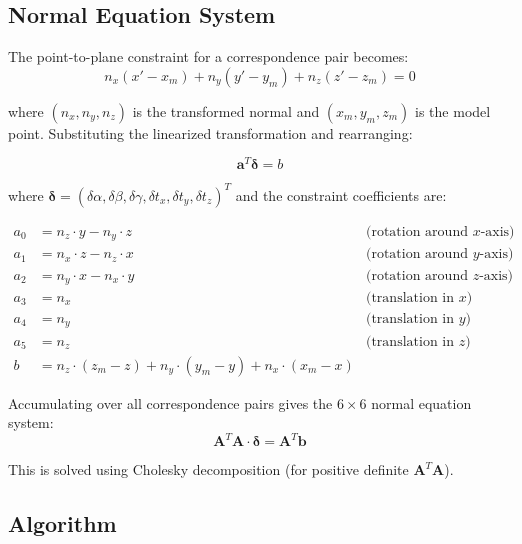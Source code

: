 \documentclass[11pt,a4paper]{article}
\begin{document}
\subsection{Normal Equation System}

The point-to-plane constraint for a correspondence pair becomes:
\begin{equation}
n_x(x' - x_m) + n_y(y' - y_m) + n_z(z' - z_m) = 0
\end{equation}

where $(n_x, n_y, n_z)$ is the transformed normal and $(x_m, y_m, z_m)$ is the model point. Substituting the linearized transformation and rearranging:

\begin{equation}
\mathbf{a}^T \boldsymbol{\delta} = b
\end{equation}

where $\boldsymbol{\delta} = (\delta\alpha, \delta\beta, \delta\gamma, \delta t_x, \delta t_y, \delta t_z)^T$ and the constraint coefficients are:

\begin{align}
a_0 &= n_z \cdot y - n_y \cdot z & \text{(rotation around } x\text{-axis)} \\
a_1 &= n_x \cdot z - n_z \cdot x & \text{(rotation around } y\text{-axis)} \\
a_2 &= n_y \cdot x - n_x \cdot y & \text{(rotation around } z\text{-axis)} \\
a_3 &= n_x & \text{(translation in } x\text{)} \\
a_4 &= n_y & \text{(translation in } y\text{)} \\
a_5 &= n_z & \text{(translation in } z\text{)} \\
b &= n_z \cdot (z_m - z) + n_y \cdot (y_m - y) + n_x \cdot (x_m - x)
\end{align}

Accumulating over all correspondence pairs gives the $6 \times 6$ normal equation system:
\begin{equation}
\mathbf{A}^T\mathbf{A} \cdot \boldsymbol{\delta} = \mathbf{A}^T\mathbf{b}
\end{equation}

This is solved using Cholesky decomposition (for positive definite $\mathbf{A}^T\mathbf{A}$).

\subsection{Algorithm}
\end{document}
